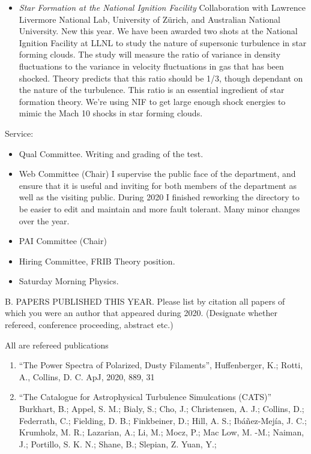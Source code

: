 \begin{itemize}
    \item \emph{Star Formation at the National Ignition Facility}  
        Collaboration with Lawrence Livermore National Lab, University of
        Z\"urich, and Australian National University. New this year.  We have been awarded two
        shots at the National Ignition Facility at LLNL to study the nature of
        supersonic turbulence in star forming clouds.  The study will measure
        the ratio of variance in density fluctuations to the variance in
        velocity fluctuations in gas that has been shocked.  Theory predicts
        that this ratio should be 1/3, though dependant on the nature of the
        turbulence.  This ratio is an essential ingredient of star formation
        theory.   We're using NIF to get large enough shock energies to mimic
        the Mach 10 shocks in star forming clouds.

\end{itemize}
\vskip 30pt

\noindent
Service:
\begin{itemize}
	\item Qual Committee.  Writing and grading of the test.
	\item Web Committee (Chair) I supervise the public face of the department,
        and ensure that it is useful and inviting for both members of the
        department as well as the visiting public.  During 2020 I finished
        reworking the directory to be easier to edit and maintain and more fault
        tolerant.  Many minor changes over the year.
    \item PAI Committee (Chair)     
    \item Hiring Committee, FRIB Theory position.  
	\item Saturday Morning Physics.  
\end{itemize}	
\vskip 30pt



\noindent B. PAPERS PUBLISHED THIS YEAR. Please list by citation all
papers of which you were an author that appeared during 2020.
(Designate whether refereed, conference proceeding, abstract etc.)
\bigskip

All are refereed publications

\begin{enumerate}
    \item ``The Power Spectra of Polarized, Dusty Filaments'', Huffenberger, K.; Rotti, A., Collins, D. C. ApJ, 2020, 889, 31
   \item ``The Catalogue for Astrophysical Turbulence Simulcations (CATS)'' Burkhart, B.; Appel, S. M.; Bialy, S.; Cho, J.; Christensen, A. J.; Collins, D.; Federrath, C.; Fielding, D. B.; Finkbeiner, D.; Hill, A. S.; Ibáñez-Mejía, J. C.; Krumholz, M. R.; Lazarian, A.; Li, M.; Mocz, P.; Mac Low, M. -M.; Naiman, J.; Portillo, S. K. N.; Shane, B.; Slepian, Z. Yuan, Y.;
\end{enumerate}

